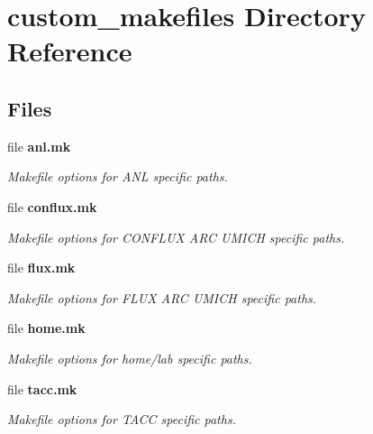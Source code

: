 \section{custom\-\_\-makefiles Directory Reference}
\label{dir_04af7380ae479bd0dc939c2c76fca574}
\subsection*{Files}
\begin{DoxyCompactItemize}
\item 
file {\bf anl.\-mk}
\begin{DoxyCompactList}\small\item\em Makefile options for A\-N\-L specific paths. \end{DoxyCompactList}\item 
file {\bf conflux.\-mk}
\begin{DoxyCompactList}\small\item\em Makefile options for C\-O\-N\-F\-L\-U\-X A\-R\-C U\-M\-I\-C\-H specific paths. \end{DoxyCompactList}\item 
file {\bf flux.\-mk}
\begin{DoxyCompactList}\small\item\em Makefile options for F\-L\-U\-X A\-R\-C U\-M\-I\-C\-H specific paths. \end{DoxyCompactList}\item 
file {\bf home.\-mk}
\begin{DoxyCompactList}\small\item\em Makefile options for home/lab specific paths. \end{DoxyCompactList}\item 
file {\bf tacc.\-mk}
\begin{DoxyCompactList}\small\item\em Makefile options for T\-A\-C\-C specific paths. \end{DoxyCompactList}\end{DoxyCompactItemize}

